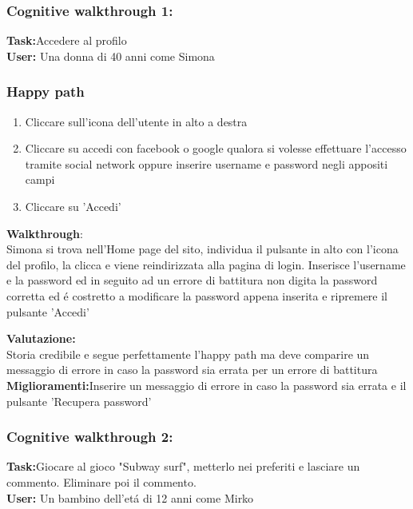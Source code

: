 \documentclass[../Report.tex]{subfiles}
\begin{document}
    \subsubsection{Cognitive walkthrough 1:}
    \textbf{Task:}Accedere al profilo\\
    \textbf{User:} Una donna di 40 anni come Simona
    \subsubsection{Happy path}
    \begin{enumerate}
        \item Cliccare sull'icona dell'utente in alto a destra
        \item Cliccare su accedi con facebook o google qualora si volesse effettuare l'accesso tramite social network oppure inserire username e password negli appositi campi
        \item Cliccare su 'Accedi'
    \end{enumerate}
    \textbf{Walkthrough}:\\
    Simona si trova nell'Home page del sito, individua il pulsante in alto con l'icona del profilo, la clicca e viene reindirizzata alla pagina di login.
    Inserisce l'username e la password ed in seguito ad un errore di battitura non digita la password corretta ed é costretto a modificare la password appena inserita e ripremere il pulsante 'Accedi'

    \textbf{Valutazione:}\\Storia credibile e segue perfettamente l'happy path ma deve comparire un messaggio di errore in caso la password sia errata per un errore di battitura\\

    \textbf{Miglioramenti:}Inserire un messaggio di errore in caso la password sia errata e il pulsante 'Recupera password'\\

    \subsubsection{Cognitive walkthrough 2:}
    \textbf{Task:}Giocare al gioco "Subway surf", metterlo nei preferiti e lasciare un commento. Eliminare poi il commento.\\
    \textbf{User:} Un bambino dell'etá di 12 anni come Mirko
\end{document}
